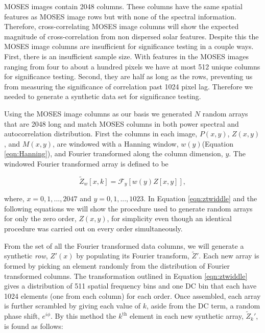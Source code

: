 \documentclass[]{solarphysics}
\begin{document}
\begin{article}
	MOSES images contain 2048 columns.  These columns have the same spatial features as MOSES image rows but with none of the spectral information.  Therefore, cross-correlating MOSES image columns will show the expected magnitude of cross-correlation from non dispersed solar features.  Despite this the MOSES image columns are insufficient for significance testing in a couple ways.  First, there is an insufficient sample size.  With features in the MOSES images ranging from four to about a hundred pixels we have at most 512 unique columns for significance testing.  Second, they are half as long as the rows, preventing us from measuring the significance of correlation past 1024 pixel lag.  Therefore we needed to generate a synthetic data set for significance testing.
	
	Using the MOSES image columns as our basis we generated $N$ random arrays that are 2048 long and match MOSES columns in both power spectral and autocorrelation distribution.  First the columns in each image, $P(x,y)$, $Z(x,y)$, and $M(x,y)$, are windowed with a Hanning window, $w(y)$(Equation \ref{eqn:Hanning}), and Fourier transformed along the column dimension, $y$.  The windowed Fourier transformed array is defined to be
	
	\begin{equation}
		\widetilde{Z}_w[x,k] = \mathcal{F}_y\left[ w(y)Z[x,y]\right], 
		\label{eqn:ztwiddle}
	\end{equation}
   
	where, $ x = 0,1,...,2047$ and $y = 0,1,...,1023$.  In Equation \ref{eqn:ztwiddle} and the following equations we will show the procedure used to generate random arrays for only the zero order, $Z(x,y)$, for simplicity even though an identical procedure was carried out on every order simultaneously.
	
	From the set of all the Fourier transformed data columns, we will generate a synthetic \emph{row}, $Z'(x)$ by populating its Fourier transform, $\widetilde{Z}'$. Each new array is formed by picking an element randomly from the distribution of Fourier transformed columns. The transformation outlined in Equation \ref{eqn:ztwiddle} gives a distribution of 511 spatial frequency bins and one DC bin that each have 1024 elements (one from each column) for each order. Once assembled, each array is further scrambled by giving each value of $k$, aside from the DC term, a random phase shift, $e^{i\phi}$.  By this method the $k^{\mathrm{th}}$ element in each new synthetic array, $\widetilde{Z}_k'$, is found as follows:
	

\end{article}
\end{document}
